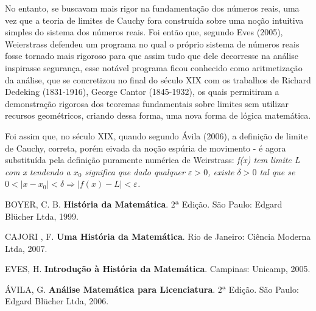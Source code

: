 \documentclass{article}
\begin{document}
\medskip
 No entanto, se buscavam
mais rigor na fundamentação dos números reais, uma vez que a teoria
de limites de Cauchy fora construída sobre uma noção intuitiva
simples do sistema dos números reais. Foi então que, segundo Eves
(2005), Weierstrass defendeu um programa no qual o próprio sistema
de números reais fosse tornado mais rigoroso para que assim tudo que
dele decorresse na análise inspirasse segurança, esse notável
programa ficou conhecido como aritmetização da análise, que se
concretizou no final do século XIX com os trabalhos de Richard
Dedeking (1831-1916), George Cantor (1845-1932), os quais permitiram
a demonstração rigorosa dos teoremas fundamentais sobre limites sem
utilizar recursos geométricos, criando dessa forma, uma nova forma
de lógica matemática.

\medskip
Foi assim que, no século XIX, quando segundo Ávila (2006), a
definição de limite de Cauchy, correta, porém eivada da noção
espúria de movimento - é agora substituída pela definição puramente
numérica de Weirstrass: \emph{f(x) tem limite L com x tendendo a
$x_{0}$ significa que dado qualquer $\varepsilon>0$, existe
$\delta>0$ tal que se
$0<|x-x_0|<\delta\Rightarrow|f(x)-L|<\varepsilon$.}




\begin{thebibliography}{99}
BOYER, C. B. {\bf História da Matemática}. $2ª$ Edição. São Paulo:
Edgard Blücher Ltda, 1999.

CAJORI , F. {\bf Uma História da Matemática}. Rio de Janeiro:
Ciência Moderna Ltda, 2007.

EVES, H. {\bf Introdução à História da Matemática}. Campinas:
Unicamp, 2005.

ÁVILA, G. {\bf Análise Matemática para Licenciatura}. $2ª$ Edição.
São Paulo: Edgard Blücher Ltda, 2006.



\end{thebibliography}

 
\end{document}
